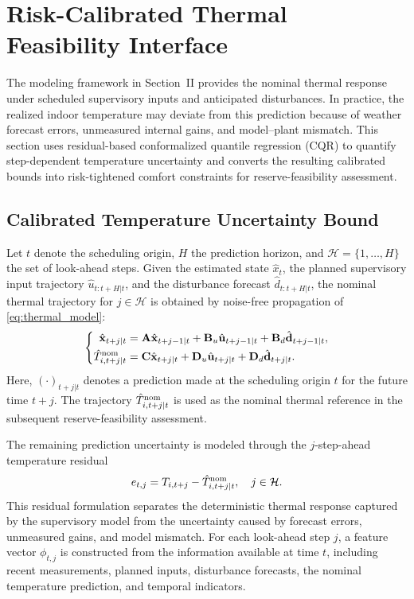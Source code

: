 \documentclass[journal]{IEEEtran}
\theoremstyle{remark}
\begin{document}
\section{Risk-Calibrated Thermal Feasibility Interface}
\label{sec:uncertainty}

The modeling framework in Section~II provides the nominal thermal response under scheduled supervisory inputs and anticipated disturbances. In practice, the realized indoor temperature may deviate from this prediction because of weather forecast errors, unmeasured internal gains, and model--plant mismatch. This section uses residual-based conformalized quantile regression (CQR) \cite{Romano2019CQR} to quantify step-dependent temperature uncertainty and converts the resulting calibrated bounds into risk-tightened comfort constraints for reserve-feasibility assessment.

\subsection{Calibrated Temperature Uncertainty Bound}

Let \(t\) denote the scheduling origin, \(H\) the prediction horizon, and \(\mathcal{H}=\{1,\ldots,H\}\) the set of look-ahead steps. Given the estimated state $\hat x_t$, the planned supervisory input trajectory $\hat u_{t:t+H|t}$, and the disturbance forecast $\hat d_{t:t+H|t}$, the nominal thermal
trajectory for \(j\in\mathcal H\) is obtained by noise-free propagation of \eqref{eq:thermal_model}:
\begin{equation}
	\left\{
	\begin{aligned}
		\hat{\mathbf{x}}_{t+j|t}
		&=
		\mathbf{A}\hat{\mathbf{x}}_{t+j-1|t}
		+
		\mathbf{B}_{u}\hat{\mathbf{u}}_{t+j-1|t}
		+
		\mathbf{B}_{d}\hat{\mathbf{d}}_{t+j-1|t},\\
		\hat T^{\rm nom}_{i,t+j|t}
		&=
		\mathbf{C}\hat{\mathbf{x}}_{t+j|t}
		+
		\mathbf{D}_{u}\hat{\mathbf{u}}_{t+j|t}
		+
		\mathbf{D}_{d}\hat{\mathbf{d}}_{t+j|t}.
	\end{aligned}
	\right.
	\label{eq:nominal_prediction}
\end{equation}
Here, \((\cdot)_{t+j|t}\) denotes a prediction made at the scheduling
origin \(t\) for the future time \(t+j\). The trajectory
\(\hat T^{\rm nom}_{i,t+j|t}\) is used as the nominal thermal reference
in the subsequent reserve-feasibility assessment.

The remaining prediction uncertainty is modeled through the
\(j\)-step-ahead temperature residual
\begin{equation}
	e_{t,j}
	=
	T_{i,t+j}
	-
	\hat T^{\rm nom}_{i,t+j|t},
	\quad j\in\mathcal H .
	\label{eq:temperature_residual}
\end{equation}
This residual formulation separates the deterministic thermal response
captured by the supervisory model from the uncertainty caused by
forecast errors, unmeasured gains, and model mismatch. For each
look-ahead step \(j\), a feature vector \(\phi_{t,j}\) is constructed
from the information available at time \(t\), including recent
measurements, planned inputs, disturbance forecasts, the nominal
temperature prediction, and temporal indicators.
\end{document}
